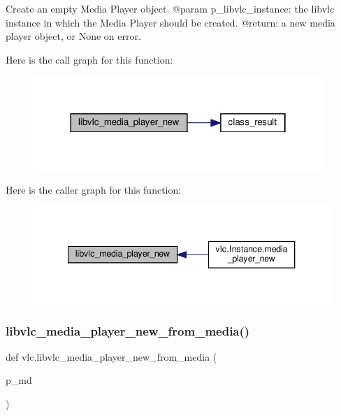 \begin{DoxyVerb}Create an empty Media Player object.
@param p_libvlc_instance: the libvlc instance in which the Media Player should be created.
@return: a new media player object, or None on error.
\end{DoxyVerb}
 Here is the call graph for this function\+:
\nopagebreak
\begin{figure}[H]
\begin{center}
\leavevmode
\includegraphics[width=310pt]{namespacevlc_afb765953dae813dbf71b86a8aec719fe_cgraph}
\end{center}
\end{figure}
Here is the caller graph for this function\+:
\nopagebreak
\begin{figure}[H]
\begin{center}
\leavevmode
\includegraphics[width=340pt]{namespacevlc_afb765953dae813dbf71b86a8aec719fe_icgraph}
\end{center}
\end{figure}
\mbox{\label{namespacevlc_a552e823b93376bc5531aaea72b1526c5}} 
\subsubsection{\texorpdfstring{libvlc\+\_\+media\+\_\+player\+\_\+new\+\_\+from\+\_\+media()}{libvlc\_media\_player\_new\_from\_media()}}
{\footnotesize\ttfamily def vlc.\+libvlc\+\_\+media\+\_\+player\+\_\+new\+\_\+from\+\_\+media (\begin{DoxyParamCaption}\item[{}]{p\+\_\+md }\end{DoxyParamCaption})}

